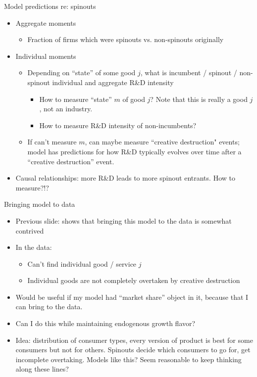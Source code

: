 \documentclass[english,usenames,dvipsnames]{beamer}
\begin{document}
\begin{frame}{Model predictions re: spinouts}
\begin{itemize}
	\item Aggregate moments
	\begin{itemize}
		\item Fraction of firms which were spinouts vs. non-spinouts originally
	\end{itemize}
	\item Individual moments
	\begin{itemize}
		\item Depending on ``state'' of some good $j$, what is incumbent / spinout / non-spinout individual and aggregate R\&D intensity
		\begin{itemize}
			\item How to measure ``state'' $m$ of good $j$? Note that this is really a good $j$, not an industry.
			\item How to measure R\&D intensity of non-incumbents?
		\end{itemize}
 		\item If can't measure $m$, can maybe measure ``creative destruction" events; model has predictions for how R\&D typically evolves over time after a ``creative destruction'' event.
	\end{itemize}
	\item Causal relationships: more R\&D leads to more spinout entrants. How to measure?!?
\end{itemize}
\end{frame}

\begin{frame}{Bringing model to data}
\begin{itemize}
	\item Previous slide: shows that bringing this model to the data is somewhat contrived
	\item In the data:
	\begin{itemize}
		\item Can't find individual good / service $j$
		\item Individual goods are not completely overtaken by creative destruction
	\end{itemize}
	\item Would be useful if my model had ``market share'' object in it, because that I can bring to the data. 
	\item Can I do this while maintaining endogenous growth flavor?
	\item Idea: distribution of consumer types, every version of product is best for some consumers but not for others. Spinouts decide which consumers to go for, get incomplete overtaking. Models like this? Seem reasonable to keep thinking along these lines?
\end{itemize}
\end{frame}
\end{document}
